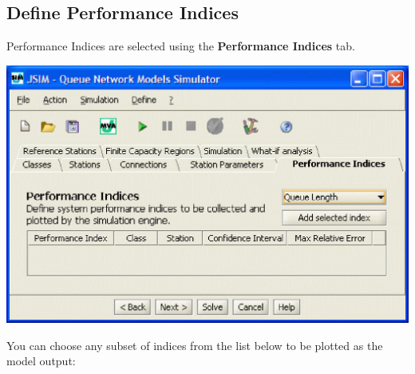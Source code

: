 \subsection{Define Performance Indices}
\label{sec:DefinePerformanceIndices}
Performance Indices are selected using the \textbf{Performance Indices} tab.
\begin{center}
\includegraphics[scale=.5]{img/jsim/define_indices1.eps}
\end{center}
You can choose any subset of indices from the list below to be
plotted as the model output:
